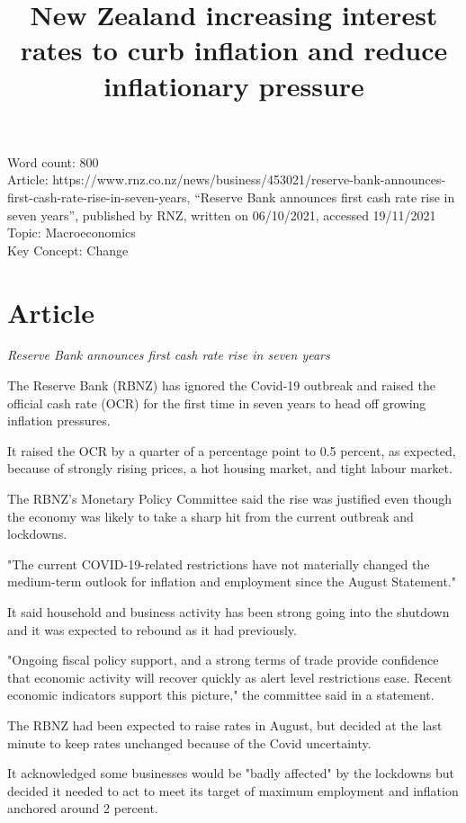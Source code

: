 \documentclass[a4paper,12pt]{article}
\title{New Zealand increasing interest rates to curb inflation and reduce inflationary pressure}
\author{}
\date{}
\begin{document}
\maketitle

Word count: 800\\
Article: https://www.rnz.co.nz/news/business/453021/reserve-bank-announces-first-cash-rate-rise-in-seven-years, ``Reserve Bank announces first cash rate rise in seven years'', published by RNZ, written on 06/10/2021, accessed 19/11/2021\\
Topic: Macroeconomics\\
Key Concept: Change

\newpage

\section*{Article}

\textit{Reserve Bank announces first cash rate rise in seven years}

The Reserve Bank (RBNZ) has ignored the Covid-19 outbreak and raised the official cash rate (OCR) for the first time in seven years to head off growing inflation pressures.

It raised the OCR by a quarter of a percentage point to 0.5 percent, as expected, because of strongly rising prices, a hot housing market, and tight labour market.

The RBNZ's Monetary Policy Committee said the rise was justified even though the economy was likely to take a sharp hit from the current outbreak and lockdowns.

"The current COVID-19-related restrictions have not materially changed the medium-term outlook for inflation and employment since the August Statement."

It said household and business activity has been strong going into the shutdown and it was expected to rebound as it had previously.

"Ongoing fiscal policy support, and a strong terms of trade provide confidence that economic activity will recover quickly as alert level restrictions ease. Recent economic indicators support this picture," the committee said in a statement.

The RBNZ had been expected to raise rates in August, but decided at the last minute to keep rates unchanged because of the Covid uncertainty.

It acknowledged some businesses would be "badly affected" by the lockdowns but decided it needed to act to meet its target of maximum employment and inflation anchored around 2 percent.
\end{document}
